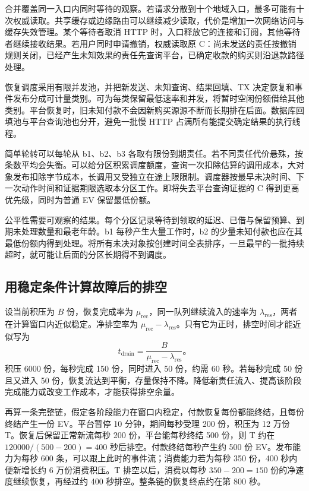 
合并覆盖同一入口内同时等待的观察。若请求分散到十个地域入口，最多可能有十次权威读取。共享缓存或边缘路由可以继续减少读取，代价是增加一次网络访问与缓存失效管理。某个等待者取消 HTTP 时，入口释放它的连接和订阅，其他等待者继续接收结果。若用户同时申请撤销，权威读取原 C：尚未发送的责任按撤销规则关闭，已经产生未知效果的责任先查询平台，已确定收款的购买则沿退款路径处理。

恢复调度采用有限并发池，并把新发送、未知查询、结果回填、TX 决定恢复和事件发布分成可计量类别。可为每类保留最低速率和并发，将暂时空闲份额借给其他类别。平台恢复时，旧未知付款不会因新购买源源不断而长期排在后面。数据库回填池与平台查询池也分开，避免一批慢 HTTP 占满所有能提交确定结果的执行线程。


简单轮转可以每轮从 b1、b2、b3 各取有限份到期责任。若不同责任代价悬殊，按条数平均会失衡。可以给分区积累调度额度，查询一次扣除估算的调用成本，大对象发布扣除字节成本，长调用又受独立在途上限限制。调度器按最早未决时间、下一次动作时间和证据期限选取本分区工作。即将失去平台查询证据的 C 得到更高优先级，同时为普通 EV 保留最低份额。

公平性需要可观察的结果。每个分区记录等待到领取的延迟、已借与保留预算、到期未处理数量和最老年龄。b1 每秒产生大量工作时，b2 的少量未知付款也应在其最低份额内得到处理。将所有未决对象按创建时间全表排序，一旦最早的一批持续超时，就可能让后面的分区长期得不到调度。

\subsection{用稳定条件计算故障后的排空}

设当前积压为 $B$ 份，恢复完成率为 $\mu_{\mathrm{rec}}$，同一队列继续流入的速率为 $\lambda_{\mathrm{res}}$，两者在计算窗口内近似稳定。净排空率为 $\mu_{\mathrm{rec}}-\lambda_{\mathrm{res}}$。只有它为正时，排空时间才能近似写为
\[
t_{\mathrm{drain}}=\frac{B}{\mu_{\mathrm{rec}}-\lambda_{\mathrm{res}}}\text{。}
\]
积压 6000 份，每秒完成 150 份，同时进入 50 份，约需 60 秒。若每秒完成 50 份且又进入 50 份，恢复流达到平衡，存量保持不降。降低新责任流入、提高该阶段完成能力或改变工作成本，才能获得排空余量。

再算一条完整链，假定各阶段能力在窗口内稳定，付款恢复每份都能终结，且每份终结产生一份 EV。平台暂停 10 分钟，期间每秒受理 200 份，积压为 12 万份 T。恢复后保留正常新流每秒 200 份，平台能每秒终结 500 份，则 T 约在 $120000/(500-200)=400$ 秒后排空。付款终结每秒产生约 500 份 EV。发布能力为每秒 600 条，可以跟上此时的事件流；消费能力若为每秒 350 份，400 秒内便新增长约 6 万份消费积压。T 排空以后，消费以每秒 $350-200=150$ 份的净速度继续恢复，再经过约 400 秒排空。整条链的恢复终点约在第 800 秒。

